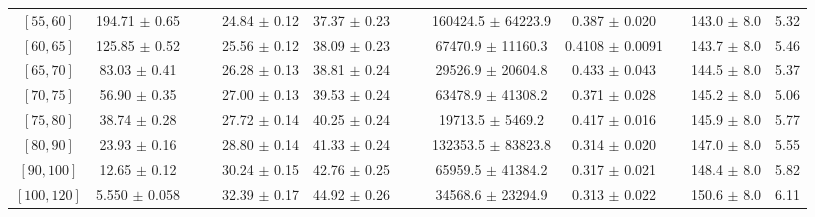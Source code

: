 \begin{tabular}{c||c|c|c|c|c|c|c|c|c|c|c||c}
$[55, 60]$ & 194.71 $\pm$ 0.65 &  &  & 24.84 $\pm$ 0.12 & 37.37 $\pm$ 0.23 &  &  & 160424.5 $\pm$ 64223.9 & 0.387 $\pm$ 0.020 &  & 143.0 $\pm$ 8.0 & 5.32\\
$[60, 65]$ & 125.85 $\pm$ 0.52 &  &  & 25.56 $\pm$ 0.12 & 38.09 $\pm$ 0.23 &  &  & 67470.9 $\pm$ 11160.3 & 0.4108 $\pm$ 0.0091 &  & 143.7 $\pm$ 8.0 & 5.46\\
$[65, 70]$ & 83.03 $\pm$ 0.41 &  &  & 26.28 $\pm$ 0.13 & 38.81 $\pm$ 0.24 &  &  & 29526.9 $\pm$ 20604.8 & 0.433 $\pm$ 0.043 &  & 144.5 $\pm$ 8.0 & 5.37\\
$[70, 75]$ & 56.90 $\pm$ 0.35 &  &  & 27.00 $\pm$ 0.13 & 39.53 $\pm$ 0.24 &  &  & 63478.9 $\pm$ 41308.2 & 0.371 $\pm$ 0.028 &  & 145.2 $\pm$ 8.0 & 5.06\\
$[75, 80]$ & 38.74 $\pm$ 0.28 &  &  & 27.72 $\pm$ 0.14 & 40.25 $\pm$ 0.24 &  &  & 19713.5 $\pm$ 5469.2 & 0.417 $\pm$ 0.016 &  & 145.9 $\pm$ 8.0 & 5.77\\
$[80, 90]$ & 23.93 $\pm$ 0.16 &  &  & 28.80 $\pm$ 0.14 & 41.33 $\pm$ 0.24 &  &  & 132353.5 $\pm$ 83823.8 & 0.314 $\pm$ 0.020 &  & 147.0 $\pm$ 8.0 & 5.55\\
$[90, 100]$ & 12.65 $\pm$ 0.12 &  &  & 30.24 $\pm$ 0.15 & 42.76 $\pm$ 0.25 &  &  & 65959.5 $\pm$ 41384.2 & 0.317 $\pm$ 0.021 &  & 148.4 $\pm$ 8.0 & 5.82\\
$[100, 120]$ & 5.550 $\pm$ 0.058 &  &  & 32.39 $\pm$ 0.17 & 44.92 $\pm$ 0.26 &  &  & 34568.6 $\pm$ 23294.9 & 0.313 $\pm$ 0.022 &  & 150.6 $\pm$ 8.0 & 6.11\\
\end{tabular}
